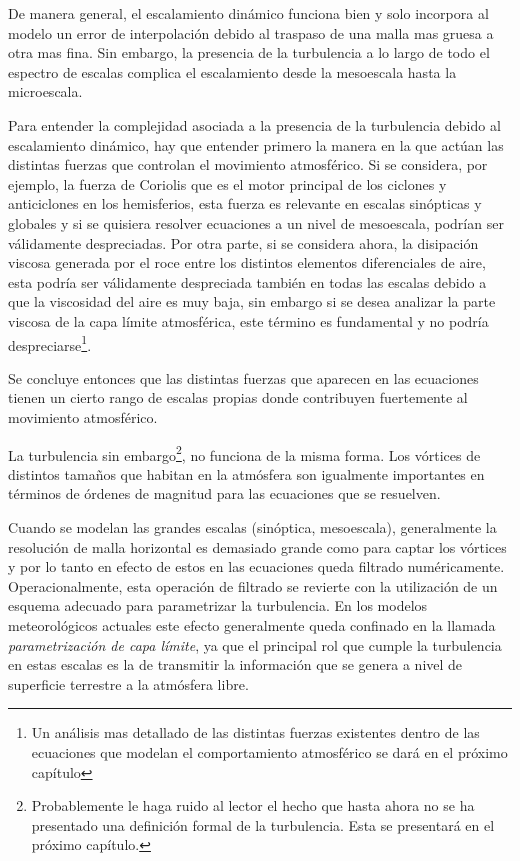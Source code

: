 De manera general, el escalamiento dinámico funciona bien y solo incorpora al modelo un error de interpolación debido al traspaso de una malla mas gruesa a otra mas fina. Sin embargo, la presencia de la turbulencia a lo largo de todo el espectro de escalas complica el escalamiento desde la mesoescala hasta la microescala.

Para entender la complejidad asociada a la presencia de la turbulencia debido al escalamiento dinámico, hay que entender primero la manera en la que actúan las distintas fuerzas que controlan el movimiento atmosférico. Si se considera, por ejemplo, la fuerza de Coriolis que es el motor principal de los ciclones y anticiclones en los hemisferios, esta fuerza es relevante en escalas sinópticas y globales y si se quisiera resolver ecuaciones a un nivel de mesoescala, podrían ser válidamente despreciadas. Por otra parte, si se considera ahora, la disipación viscosa generada por el roce entre los distintos elementos diferenciales de aire, esta podría ser válidamente despreciada también en todas las escalas debido a que la viscosidad del aire es muy baja, sin embargo si se desea analizar la parte viscosa de la capa límite atmosférica, este término es fundamental y no podría despreciarse\footnote{Un análisis mas detallado de las distintas fuerzas existentes dentro de las ecuaciones que modelan el comportamiento atmosférico se dará en el próximo capítulo}. 
 
Se concluye entonces que las distintas fuerzas que aparecen en las ecuaciones tienen un cierto rango de escalas propias donde contribuyen fuertemente al movimiento atmosférico. 

La turbulencia sin embargo\footnote{Probablemente le haga ruido al lector el hecho que hasta ahora no se ha presentado una definición formal de la turbulencia. Esta se presentará en el próximo capítulo.}, no funciona de la misma forma. Los vórtices de distintos tamaños que habitan en la atmósfera son igualmente importantes en términos de órdenes de magnitud para las ecuaciones que se resuelven.

Cuando se modelan las grandes escalas (sinóptica, mesoescala), generalmente la resolución de malla horizontal es demasiado grande como para captar los vórtices y por lo tanto en efecto de estos en las ecuaciones queda filtrado numéricamente. Operacionalmente, esta operación de filtrado se revierte con la utilización de un esquema adecuado para parametrizar la turbulencia. En los modelos meteorológicos actuales este efecto generalmente queda confinado en la llamada \emph{parametrización de capa límite}, ya que el principal rol que cumple la turbulencia en estas escalas es la de transmitir la información que se genera a nivel de superficie terrestre a la atmósfera libre.

